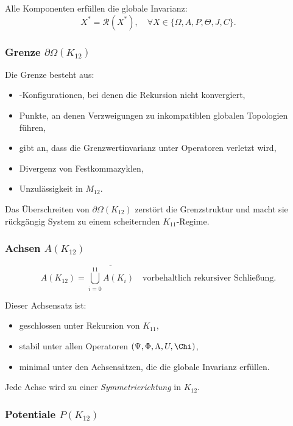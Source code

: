 Alle Komponenten erfüllen die globale Invarianz:
\[
X^* = \mathcal{R}(X^*),\quad \forall X \in \{\Omega, A, P, \Theta, J, C\}.
\]

\subsubsection{Grenze $\partial\Omega(K_{12})$}

Die Grenze besteht aus:
\begin{itemize}
    \item-Konfigurationen, bei denen die Rekursion nicht konvergiert,
    \item Punkte, an denen Verzweigungen zu inkompatiblen globalen Topologien führen,
    \item gibt an, dass die Grenzwertinvarianz unter Operatoren verletzt wird,
    \item Divergenz von Festkommazyklen,
    \item Unzulässigkeit in $M_{12}$.
\end{itemize}

Das Überschreiten von $\partial\Omega(K_{12})$ zerstört die Grenzstruktur und macht sie rückgängig
System zu einem scheiternden $K_{11}$-Regime.

\subsubsection{Achsen $A(K_{12})$}

\[
A(K_{12}) =
\overline{\bigcup_{i=0}^{11} A(K_i)}
\quad \text{vorbehaltlich rekursiver Schließung}.
\]

Dieser Achsensatz ist:
\begin{itemize}
    \item geschlossen unter Rekursion von $K_{11}$,
    \item stabil unter allen Operatoren $(\Psi,\Phi,\Lambda,U,\Chi)$,
    \item minimal unter den Achsensätzen, die die globale Invarianz erfüllen.
\end{itemize}

Jede Achse wird zu einer \emph{Symmetrierichtung} in $K_{12}$.

\subsubsection{Potentiale $P(K_{12})$}


